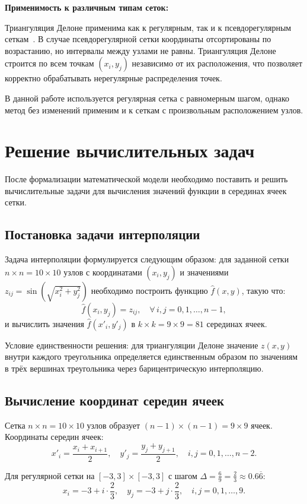 \documentclass[a4paper, 14pt]{extarticle}
\begin{document}
\textbf{Применимость к различным типам сеток:}

Триангуляция Делоне применима как к регулярным, так и к псевдорегулярным сеткам~\cite{skvortsov2002}. В случае псевдорегулярной сетки координаты отсортированы по возрастанию, но интервалы между узлами не равны. Триангуляция Делоне строится по всем точкам $(x_i, y_j)$ независимо от их расположения, что позволяет корректно обрабатывать нерегулярные распределения точек.

В данной работе используется регулярная сетка с равномерным шагом, однако метод без изменений применим и к сеткам с произвольным расположением узлов.

\section{Решение вычислительных задач}
После формализации математической модели необходимо поставить и решить вычислительные задачи для вычисления значений функции в серединах ячеек сетки.

\subsection{Постановка задачи интерполяции}

Задача интерполяции формулируется следующим образом: для заданной сетки $n \times n = 10 \times 10$ узлов с координатами $(x_i, y_j)$ и значениями $z_{ij} = \sin\!\left(\sqrt{x_i^2 + y_j^2}\right)$ необходимо построить функцию $\hat{f}(x, y)$, такую что:
\[
\hat{f}(x_i, y_j) = z_{ij}, \quad \forall\, i, j = 0, 1, \ldots, n-1,
\]
и вычислить значения $\hat{f}(x'_i, y'_j)$ в $k \times k = 9 \times 9 = 81$ серединах ячеек.

Условие единственности решения: для триангуляции Делоне значение $z(x, y)$ внутри каждого треугольника определяется единственным образом по значениям в трёх вершинах треугольника через барицентрическую интерполяцию.

\subsection{Вычисление координат середин ячеек}

Сетка $n \times n = 10 \times 10$ узлов образует $(n-1) \times (n-1) = 9 \times 9$ ячеек. Координаты середин ячеек:
\[
x'_{i} = \frac{x_i + x_{i+1}}{2}, \quad y'_{j} = \frac{y_j + y_{j+1}}{2}, \quad i, j = 0, 1, \ldots, n-2.
\]

Для регулярной сетки на $[-3, 3] \times [-3, 3]$ с шагом $\Delta = \frac{6}{9} = \frac{2}{3} \approx 0.6\overline{6}$:
\[
x_i = -3 + i \cdot \frac{2}{3}, \quad y_j = -3 + j \cdot \frac{2}{3}, \quad i, j = 0, 1, \ldots, 9.
\]
\end{document}
